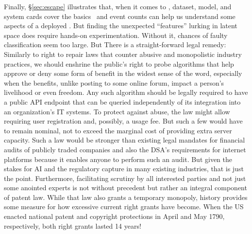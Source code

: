 Finally, \S\ref{sec:escape} illustrates that, when it comes to \AI, dataset,
model, and system cards cover the
basics~\cite{GebruMorgensternea2021,MitchellWuea2019,ProcopeCheemaea2022} and
event counts can help us understand some aspects of a deployed \AI. But finding
the unexpected ``features'' lurking in latent space does require hands-on
experimentation. Without it, chances of faulty classification seem too large.
But
There is a straight-forward legal remedy: Similarly to right to repair laws that
counter abusive and monopolistic industry practices, we should enshrine the
public’s right to probe algorithms that help approve or deny some form of
benefit in the widest sense of the word, especially when the benefits, unlike
posting to some online forum, impact a person’s livelihood or even freedom. Any
such algorithm should be legally required to have a public API endpoint that can
be queried independently of its integration into an organization’s IT systems.
To protect against abuse, the law might allow requiring user registration and,
possibly, a usage fee. But such a few would have to remain nominal, not to
exceed the marginal cost of providing extra server capacity. Such a law would be
stronger than existing legal mandates for financial audits of publicly traded
companies and also the DSA’s requirements for internet platforms because it
enables anyone to perform such an audit. But given the stakes for AI and the
regulatory capture in many existing industries, that is just the point.
Furthermore, facilitating scrutiny by all interested parties and not just some
anointed experts is not without precedent but rather an integral component of
patent law. While that law also grants a temporary monopoly, history provides
some measure for how excessive current right grants have become. When the US
enacted national patent and copyright protections in April and May 1790,
respectively, both right grants lasted 14 years!


